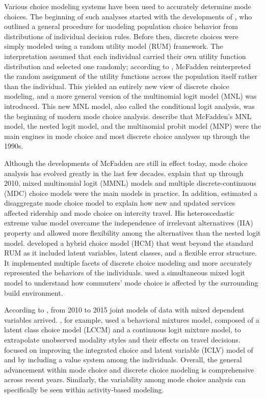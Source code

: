 \documentclass[3p, authoryear, review]{elsarticle} %
\begin{document}
Various choice modeling systems have been used to accurately determine mode choices. The beginning of such analyses started with the developments of \citet{mcfadden1973}, who outlined a general procedure for modeling population choice behavior from distributions of individual decision rules. Before then, discrete choices were simply modeled using a random utility model (RUM) framework. The interpretation assumed that each individual carried their own utility function distribution and selected one randomly; according to \citet{manski2001}, McFadden reinterpreted the random assignment of the utility functions across the population itself rather than the individual. This yielded an entirely new view of discrete choice modeling, and a more general version of the multinomial logit model (MNL) was introduced. This new MNL model, also called the conditional logit analysis, was the beginning of modern mode choice analysis. \citet{bhat20} describe that McFadden's MNL model, the nested logit model, and the multinomial probit model (MNP) were the main engines in mode choice and most discrete choice analyses up through the 1990s.

Although the developments of McFadden are still in effect today, mode choice analysis has evolved greatly in the last few decades. \citet{bhat20} explain that up through 2010, mixed multinomial logit (MMNL) models and multiple discrete-continuous (MDC) choice models were the main models in practice. In addition, \citet{bhat95} estimated a disaggregate mode choice model to explain how new and updated services affected ridership and mode choice on intercity travel. His heteroscedastic extreme value model overcame the independence of irrelevant alternatives (IIA) property and allowed more flexibility among the alternatives than the nested logit model. \citet{ben02} developed a hybrid choice model (HCM) that went beyond the standard RUM as it included latent variables, latent classes, and a flexible error structure. It implemented multiple facets of discrete choice modeling and more accurately represented the behaviors of the individuals. \citet{pinjari07} used a simultaneous mixed logit model to understand how commuters' mode choice is affected by the surrounding build environment.

According to \citet{bhat20}, from 2010 to 2015 joint models of data with mixed dependent variables arrived. \citet{vij13}, for example, used a behavioral mixtures model, composed of a latent class choice model (LCCM) and a continuous logit mixture model, to extrapolate unobserved modality styles and their effects on travel decisions. \citet{paulssen14} focused on improving the integrated choice and latent variable (ICLV) model of \citet{mcfadden86} and \citet{ben02num2} by including a value system among the individuals. Overall, the general advancement within mode choice and discrete choice modeling is comprehensive across recent years. Similarly, the variability among mode choice analysis can specifically be seen within activity-based modeling.
\end{document}
